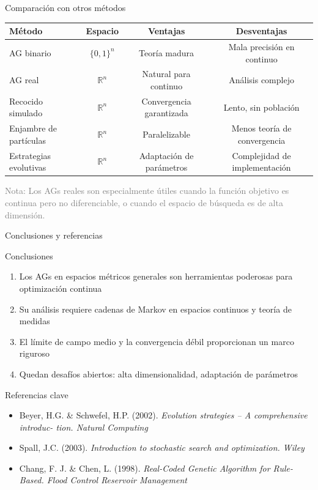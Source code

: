 \documentclass[10pt, aspectratio=169]{beamer}
\begin{document}
\begin{frame}{Comparación con otros métodos}
\begin{table}
\centering
\begin{tabular}{lccc}
\toprule
\textbf{Método} & \textbf{Espacio} & \textbf{Ventajas} & \textbf{Desventajas} \\
\midrule
AG binario & $\{0,1\}^n$ & Teoría madura & Mala precisión en continuo \\
AG real & $\mathbb{R}^n$ & Natural para continuo & Análisis complejo \\
Recocido simulado & $\mathbb{R}^n$ & Convergencia garantizada & Lento, sin población \\
Enjambre de partículas & $\mathbb{R}^n$ & Paralelizable & Menos teoría de convergencia \\
Estrategias evolutivas & $\mathbb{R}^n$ & Adaptación de parámetros & Complejidad de implementación \\
\bottomrule
\end{tabular}
\end{table}
\vspace{2mm}
\footnotesize \textcolor{gray}{Nota: Los AGs reales son especialmente útiles cuando la función objetivo es continua pero no diferenciable, o cuando el espacio de búsqueda es de alta dimensión.}
\end{frame}

\begin{frame}{Conclusiones y referencias}
\begin{block}{Conclusiones}
\begin{enumerate}
    \item Los AGs en espacios métricos generales son herramientas poderosas para \alert{optimización continua}
    \item Su análisis requiere \alert{cadenas de Markov en espacios continuos} y \alert{teoría de medidas}
    \item El límite de campo medio y la convergencia débil proporcionan un marco riguroso
    \item Quedan desafíos abiertos: alta dimensionalidad, adaptación de parámetros
\end{enumerate}
\end{block}

\begin{block}{Referencias clave}
\begin{itemize}
    \item Beyer, H.G. \& Schwefel, H.P. (2002). \textit{Evolution strategies – A comprehensive introduc-
tion. Natural Computing}
    \item Spall, J.C. (2003). \textit{Introduction to stochastic search and optimization. Wiley}
    \item Chang, F. J. \& Chen, L. (1998). \textit{Real-Coded Genetic Algorithm for Rule-Based.
Flood Control Reservoir Management}
\end{itemize}
\end{block}
\end{frame}
\end{document}
